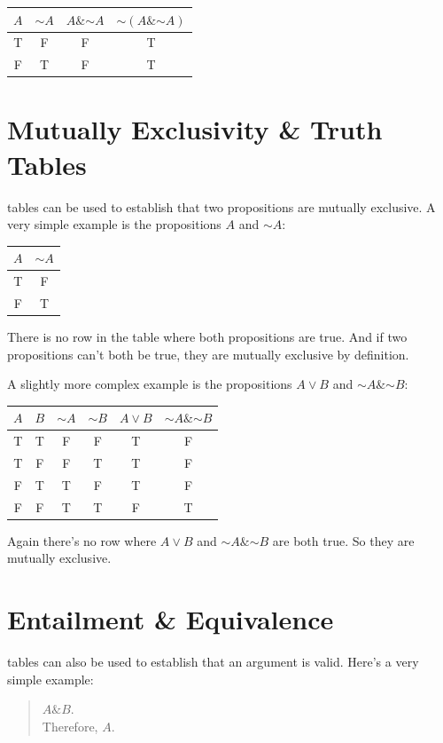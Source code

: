 \documentclass[justified]{tufte-book}
\renewcommand{\neg}{\mathbin{\sim}}
\renewcommand{\wedge}{\mathbin{\&}}
\theoremstyle{definition}
\theoremstyle{definition}
\theoremstyle{definition}
\theoremstyle{remark}
\begin{document}
\begin{longtable}[]{@{}cccc@{}}
\toprule
\(A\) & \(\neg A\) & \(A \wedge \neg A\) &
\(\neg (A \wedge \neg A)\)\tabularnewline
\midrule
\endhead
T & F & F & T\tabularnewline
F & T & F & T\tabularnewline
\bottomrule
\end{longtable}

\hypertarget{mutually-exclusivity-truth-tables}{%
\section{Mutually Exclusivity \& Truth
Tables}\label{mutually-exclusivity-truth-tables}}

 tables can be used to establish that two propositions
are mutually exclusive. A very simple example is the propositions \(A\)
and \(\neg A\):

\begin{longtable}[]{@{}cc@{}}
\toprule
\(A\) & \(\neg A\)\tabularnewline
\midrule
\endhead
T & F\tabularnewline
F & T\tabularnewline
\bottomrule
\end{longtable}

There is no row in the table where both propositions are true. And if
two propositions can't both be true, they are mutually exclusive by
definition.

A slightly more complex example is the propositions \(A \vee B\) and
\(\neg A \wedge \neg B\):

\begin{longtable}[]{@{}cccccc@{}}
\toprule
\(A\) & \(B\) & \(\neg A\) & \(\neg B\) & \(A \vee B\) &
\(\neg A \wedge \neg B\)\tabularnewline
\midrule
\endhead
T & T & F & F & T & F\tabularnewline
T & F & F & T & T & F\tabularnewline
F & T & T & F & T & F\tabularnewline
F & F & T & T & F & T\tabularnewline
\bottomrule
\end{longtable}

Again there's no row where \(A \vee B\) and \(\neg A \wedge \neg B\) are
both true. So they are mutually exclusive.

\hypertarget{entailment-equivalence}{%
\section{Entailment \& Equivalence}\label{entailment-equivalence}}

 tables can also be used to establish that an argument
is valid. Here's a very simple example:

\begin{quote}
\(A \wedge B\).\\
Therefore, \(A\).
\end{quote}
\end{document}
